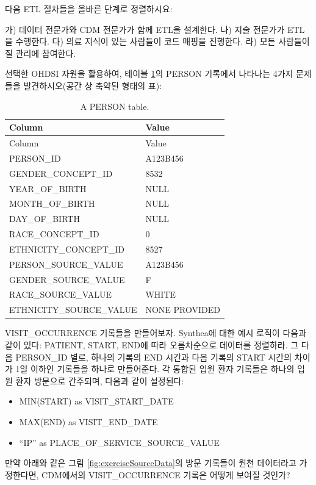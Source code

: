 \documentclass[11pt]{book}
\providecommand{\tightlist}{%
  \setlength{\itemsep}{0pt}\setlength{\parskip}{0pt}}
\theoremstyle{definition}
\theoremstyle{definition}
\theoremstyle{definition}
\theoremstyle{remark}
\let\BeginKnitrBlock\begin \let\EndKnitrBlock\end
\begin{document}
\BeginKnitrBlock{exercise}
\protect\hypertarget{exr:exerciseEtl1}{}{\label{exr:exerciseEtl1} }다음 ETL
절차들을 올바른 단계로 정렬하시요:

가) 데이터 전문가와 CDM 전문가가 함께 ETL을 설계한다. 나) 지술 전문가가
ETL을 수행한다. 다) 의료 지식이 있는 사람들이 코드 매핑을 진행한다. 라)
모든 사람들이 질 관리에 참여한다.
\EndKnitrBlock{exercise}

\BeginKnitrBlock{exercise}
\protect\hypertarget{exr:exerciseEtl2}{}{\label{exr:exerciseEtl2} }선택한
OHDSI 자원을 활용하여, 테이블 \ref{tab:exercisePersonTable}의 PERSON
기록에서 나타나는 4가지 문제들을 발견하시오(공간 상 축약된 형태의 표):

\begin{longtable}[]{@{}ll@{}}
\caption{\label{tab:exercisePersonTable} A PERSON table.}\tabularnewline
\toprule
Column & Value\tabularnewline
\midrule
\endfirsthead
\toprule
Column & Value\tabularnewline
\midrule
\endhead
PERSON\_ID & A123B456\tabularnewline
GENDER\_CONCEPT\_ID & 8532\tabularnewline
YEAR\_OF\_BIRTH & NULL\tabularnewline
MONTH\_OF\_BIRTH & NULL\tabularnewline
DAY\_OF\_BIRTH & NULL\tabularnewline
RACE\_CONCEPT\_ID & 0\tabularnewline
ETHNICITY\_CONCEPT\_ID & 8527\tabularnewline
PERSON\_SOURCE\_VALUE & A123B456\tabularnewline
GENDER\_SOURCE\_VALUE & F\tabularnewline
RACE\_SOURCE\_VALUE & WHITE\tabularnewline
ETHNICITY\_SOURCE\_VALUE & NONE PROVIDED\tabularnewline
\bottomrule
\end{longtable}
\EndKnitrBlock{exercise}

\BeginKnitrBlock{exercise}
\protect\hypertarget{exr:exerciseEtl3}{}{\label{exr:exerciseEtl3}
}VISIT\_OCCURRENCE 기록들을 만들어보자. Synthea에 대한 예시 로직이
다음과 같이 있다: PATIENT, START, END에 따라 오름차순으로 데이터를
정렬하라. 그 다음 PERSON\_ID 별로, 하나의 기록의 END 시간과 다음 기록의
START 시간의 차이가 1일 이하인 기록들을 하나로 만들어준다. 각 통합된
입원 환자 기록들은 하나의 입원 환자 방문으로 간주되며, 다음과 같이
설정된다:

\begin{itemize}
\tightlist
\item
  MIN(START) as VISIT\_START\_DATE
\item
  MAX(END) as VISIT\_END\_DATE
\item
  ``IP'' as PLACE\_OF\_SERVICE\_SOURCE\_VALUE
\end{itemize}

만약 아래와 같은 그림 \ref{fig:exerciseSourceData}의 방문 기록들이 원천
데이터라고 가정한다면, CDM에서의 VISIT\_OCCURRENCE 기록은 어떻게 보여질
것인가?
\EndKnitrBlock{exercise}
\end{document}
